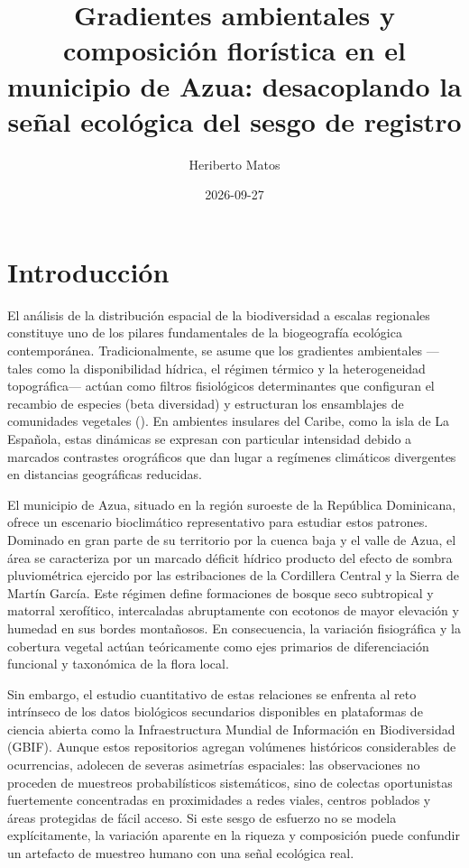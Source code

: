 \documentclass[
  12pt,
  man,
  floatsintext]{apa7}
\affiliation{Universidad Autónoma de Santo Domingo (UASD)}
\title{Gradientes ambientales y composición florística en el municipio de Azua: desacoplando la señal ecológica del sesgo de registro}
\author{Heriberto Matos}
\date{2026-09-27}
\begin{document}
\maketitle

{
\hypersetup{linkcolor=}
\setcounter{tocdepth}{2}
\tableofcontents
}
\section{Introducción}\label{introducciuxf3n}

El análisis de la distribución espacial de la biodiversidad a escalas regionales constituye uno de los pilares fundamentales de la biogeografía ecológica contemporánea. Tradicionalmente, se asume que los gradientes ambientales ---tales como la disponibilidad hídrica, el régimen térmico y la heterogeneidad topográfica--- actúan como filtros fisiológicos determinantes que configuran el recambio de especies (beta diversidad) y estructuran los ensamblajes de comunidades vegetales (). En ambientes insulares del Caribe, como la isla de La Española, estas dinámicas se expresan con particular intensidad debido a marcados contrastes orográficos que dan lugar a regímenes climáticos divergentes en distancias geográficas reducidas.

El municipio de Azua, situado en la región suroeste de la República Dominicana, ofrece un escenario bioclimático representativo para estudiar estos patrones. Dominado en gran parte de su territorio por la cuenca baja y el valle de Azua, el área se caracteriza por un marcado déficit hídrico producto del efecto de sombra pluviométrica ejercido por las estribaciones de la Cordillera Central y la Sierra de Martín García. Este régimen define formaciones de bosque seco subtropical y matorral xerofítico, intercaladas abruptamente con ecotonos de mayor elevación y humedad en sus bordes montañosos. En consecuencia, la variación fisiográfica y la cobertura vegetal actúan teóricamente como ejes primarios de diferenciación funcional y taxonómica de la flora local.

Sin embargo, el estudio cuantitativo de estas relaciones se enfrenta al reto intrínseco de los datos biológicos secundarios disponibles en plataformas de ciencia abierta como la Infraestructura Mundial de Información en Biodiversidad (GBIF). Aunque estos repositorios agregan volúmenes históricos considerables de ocurrencias, adolecen de severas asimetrías espaciales: las observaciones no proceden de muestreos probabilísticos sistemáticos, sino de colectas oportunistas fuertemente concentradas en proximidades a redes viales, centros poblados y áreas protegidas de fácil acceso. Si este sesgo de esfuerzo no se modela explícitamente, la variación aparente en la riqueza y composición puede confundir un artefacto de muestreo humano con una señal ecológica real.
\end{document}
